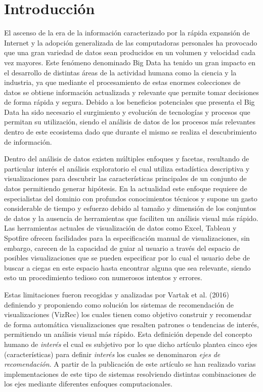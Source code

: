 \chapter*{Introducción}\label{chapter:introduction}

El ascenso de la era de la informaci\'on 
caracterizado por la r\'apida expansi\'on
de Internet y la adopci\'on generalizada de las computadoras
personales ha provocado que una gran variedad de datos sean producidos
en un volumen y velocidad cada vez mayores. Este fen\'omeno denominado
Big Data ha tenido un gran impacto en el desarrollo de distintas \'areas de la actividad humana como la ciencia y la industria, ya que mediante el procesamiento de estas enormes colecciones de datos se obtiene informaci\'on actualizada y relevante que permite tomar decisiones de forma r\'apida y segura. Debido a los beneficios potenciales que presenta el Big Data ha sido necesario el surgimiento y evoluci\'on de tecnolog\'ias y procesos que permitan su utilizaci\'on, siendo el an\'alisis de datos de los procesos m\'as relevantes dentro de este ecosistema dado que durante el mismo se realiza el descubrimiento de informaci\'on.

Dentro del an\'alisis de datos existen m\'ultiples enfoques y facetas, resultando de particular inter\'es el an\'alisis exploratorio el cual utiliza estad\'istica descriptiva y visualizaciones para descubrir las caracter\'isticas principales de un conjunto de datos permitiendo generar hip\'otesis. En la actualidad este enfoque requiere de especialistas del dominio con profundos conocimientos t\'ecnicos y supone un gasto considerable de tiempo y esfuerzo debido al tama\~no y dimensi\'on de los conjuntos de datos y la ausencia de herramientas que faciliten un an\'alisis visual m\'as r\'apido.
Las herramientas actuales de visualizaci\'on de datos como Excel, Tableau y Spotfire ofrecen facilidades para la especificaci\'on manual de visualizaciones, sin embargo, carecen de la capacidad de guiar al usuario a trav\'es del espacio de posibles visualizaciones que se pueden especificar por lo cual el usuario debe de buscar a ciegas en este espacio hasta encontrar alguna que sea relevante, siendo esto un procedimiento tedioso con numerosos intentos y errores. 

Estas limitaciones fueron recogidas y analizadas por Vartak et al. %
(2016) definiendo y proponiendo como soluci\'on los sistemas de recomendaci\'on de visualizaciones (VizRec) %
los cuales tienen como objetivo construir y recomendar de forma autom\'atica visualizaciones que resalten patrones o tendencias de inter\'es, permitiendo un an\'alisis visual m\'as r\'apido. %
Esta definici\'on depende del concepto humano de \textit{inter\'es} el cual es subjetivo por lo que dicho art\'iculo plantea cinco ejes (caracter\'isticas) para definir \textit{inter\'es} los cuales se denominaron \textit{ejes de recomendaci\'on}. A partir de la publicaci\'on de este art\'iculo se han realizado varias implementaciones de este tipo de sistemas resolviendo distintas combinaciones de los ejes mediante diferentes enfoques computacionales.

